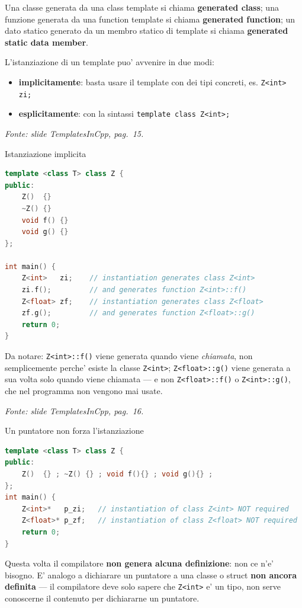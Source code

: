 \documentclass{report}
\newcommand{\code}[1]{\texttt{\small #1}}
\newcommand{\fonteslide}[1]{{\footnotesize\itshape\color{gray} Fonte: slide \emph{TemplatesInCpp}, pag.~#1.\par}}
\begin{document}
Una classe generata da una class template si chiama \textbf{generated
class}; una funzione generata da una function template si chiama
\textbf{generated function}; un dato statico generato da un membro statico
di template si chiama \textbf{generated static data member}.


L'istanziazione di un template puo' avvenire in due modi:
\begin{itemize}
    \item \textbf{implicitamente}: basta usare il template con dei tipi
          concreti, es. \code{Z<int> zi;}
    \item \textbf{esplicitamente}: con la sintassi \code{template class
          Z<int>;}
\end{itemize}

\fonteslide{15}

\begin{Example}{Istanziazione implicita}{}
\begin{lstlisting}[language=C++]
template <class T> class Z {
public:
    Z()  {}
    ~Z() {}
    void f() {}
    void g() {}
};

int main() {
    Z<int>   zi;    // instantiation generates class Z<int>
    zi.f();         // and generates function Z<int>::f()
    Z<float> zf;    // instantiation generates class Z<float>
    zf.g();         // and generates function Z<float>::g()
    return 0;
}
\end{lstlisting}
Da notare: \code{Z<int>::f()} viene generata quando viene \emph{chiamata},
non semplicemente perche' esiste la classe \code{Z<int>}; \code{Z<float>::g()}
viene generata a sua volta solo quando viene chiamata --- e non
\code{Z<float>::f()} o \code{Z<int>::g()}, che nel programma non vengono
mai usate.
\end{Example}

\fonteslide{16}

\begin{Example}{Un puntatore non forza l'istanziazione}{}
\begin{lstlisting}[language=C++]
template <class T> class Z {
public:
    Z()  {} ; ~Z() {} ; void f(){} ; void g(){} ;
};
int main() {
    Z<int>*   p_zi;   // instantiation of class Z<int> NOT required
    Z<float>* p_zf;   // instantiation of class Z<float> NOT required
    return 0;
}
\end{lstlisting}
Questa volta il compilatore \textbf{non genera alcuna definizione}: non ce
n'e' bisogno. E' analogo a dichiarare un puntatore a una classe o struct
\textbf{non ancora definita} --- il compilatore deve solo sapere che
\code{Z<int>} e' un tipo, non serve conoscerne il contenuto per dichiararne
un puntatore.
\end{Example}
\end{document}
